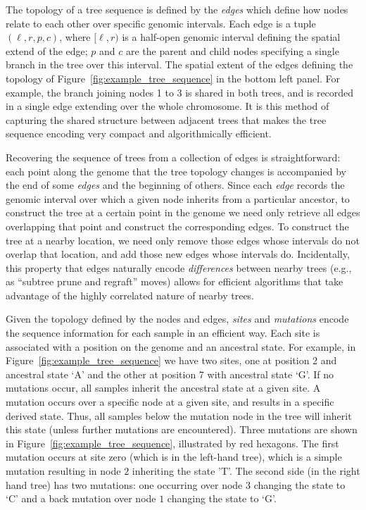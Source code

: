 \documentclass{article}
\begin{document}
The topology of a tree sequence is defined by the \emph{edges} which define how
nodes relate to each other over specific genomic intervals. Each edge is a tuple
$(\ell, r, p, c)$, where $[\ell, r)$ is a half-open genomic interval defining the
spatial extend of the edge; $p$ and $c$ are the parent and child nodes specifying
a single branch in the tree over this interval. The spatial extent of the
edges defining the topology of Figure~\ref{fig:example_tree_sequence} in the
bottom left panel. For example, the branch joining nodes 1 to 3 is shared in both trees,
and is recorded in a single edge extending over the whole chromosome. It is this
method of capturing the shared structure between adjacent trees that makes the
tree sequence encoding very compact and algorithmically efficient.

Recovering the sequence of trees from a collection of edges is straightforward:
each point along the genome that the tree topology changes
is accompanied by the end of some \emph{edges} and the beginning of others.
Since each \emph{edge} records the genomic interval 
over which a given node inherits from a particular ancestor,
to construct the tree at a certain point in the genome
we need only retrieve all edges overlapping that point
and construct the corresponding edges.
To construct the tree at a nearby location,
we need only remove those edges whose intervals do not overlap that location,
and add those new edges whose intervals do.
Incidentally, this property that edges naturally encode \emph{differences}
between nearby trees (e.g., as ``subtree prune and regraft'' moves)
allows for efficient algorithms that take advantage
of the highly correlated nature of nearby trees.

Given the topology defined by the nodes and edges, \emph{sites} and \emph{mutations}
encode the sequence information for each sample in an efficient way. Each site
is associated with a position on the genome and an ancestral state. For example,
in Figure~\ref{fig:example_tree_sequence} we have two sites, one at position
2 and ancestral state `A' and the other at position 7 with ancestral state `G'. If
no mutations occur, all samples inherit the ancestral state at a given site.
A mutation occurs over a specific node at a given site, and results in a specific
derived state. Thus, all samples below the mutation node in the tree will inherit
this state (unless further mutations are encountered). Three mutations are shown
in Figure~\ref{fig:example_tree_sequence}, illustrated by red hexagons. The first
mutation occurs at site zero (which is in the left-hand tree), which is a simple
mutation resulting in node $2$ inheriting the state 'T'. The second side (in the
right hand tree) has two mutations: one occurring over node $3$ changing the state to
`C' and a back mutation over node $1$ changing the state to `G'.
\end{document}
